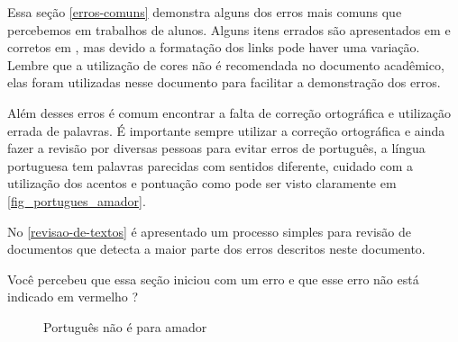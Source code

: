 Essa seção \autoref{erros-comuns} demonstra alguns dos erros mais comuns que percebemos em trabalhos de alunos. Alguns itens errados são apresentados em  e corretos em , mas devido a formatação dos links pode haver uma variação. Lembre que a utilização de cores não é recomendada no documento acadêmico, elas foram utilizadas nesse documento para facilitar a demonstração dos erros.

Além desses erros é comum encontrar a falta de correção ortográfica e utilização errada de palavras. É importante sempre utilizar a correção ortográfica e ainda fazer a revisão por diversas pessoas para evitar erros de português, a língua portuguesa tem palavras parecidas com sentidos diferente, cuidado com a utilização dos acentos e pontuação como pode ser visto claramente em  \autoref{fig_portugues_amador}.

No \autoref{revisao-de-textos} é apresentado um processo simples para revisão de documentos que detecta a maior parte dos erros descritos neste documento.

Você percebeu que essa seção iniciou com um erro e que esse erro não está indicado em vermelho ?


\begin{figure}[htb]
    \centering
	\caption{\label{fig_portugues_amador}Português não é para amador}
\end{figure}


